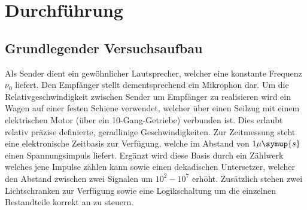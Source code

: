 \newpage
\section{Durchführung}
\label{sec:Durchführung}
\subsection{Grundlegender Versuchsaufbau}
\label{sec:Aufbau}
Als Sender dient ein gewöhnlicher Lautsprecher, welcher eine konstante Frequenz $\nu_0$ liefert. Den Empfänger stellt dementsprechend ein Mikrophon dar.
Um die Relativgeschwindigkeit zwischen Sender um Empfänger zu realisieren wird ein Wagen auf einer festen Schiene verwendet, welcher über einen Seilzug mit einem elektrischen Motor (über ein 10-Gang-Getriebe) verbunden ist. Dies erlaubt relativ präzise definierte, geradlinige Geschwindigkeiten.
Zur Zeitmessung steht eine elektronische Zeitbasis zur Verfügung, welche im Abstand von $1 \mu \symup{s}$ einen Spannungsimpuls liefert. Ergänzt wird diese Basis durch ein Zählwerk welches jene Impulse zählen kann sowie einen dekadischen Untersetzer, welcher den Abstand zwischen zwei Signalen um $10^2 - 10^7$ erhöht. Zusätzlich stehen zwei Lichtschranken zur Verfügung sowie eine Logikschaltung um die einzelnen Bestandteile korrekt an zu steuern.

